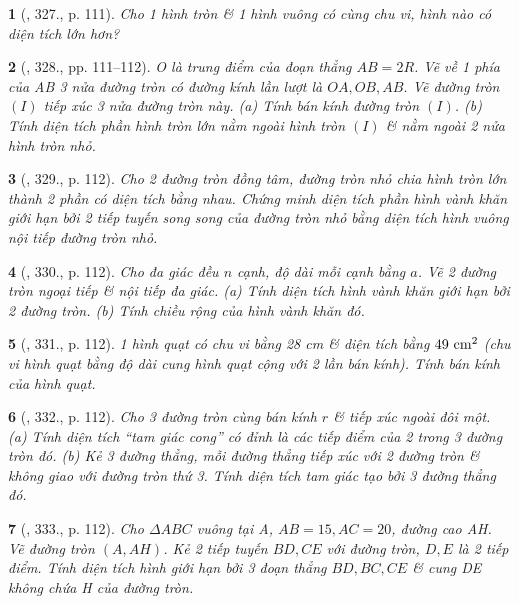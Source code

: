 \documentclass{article}
\newtheorem{baitoan}{}
\begin{document}
\begin{baitoan}[\cite{Binh_Toan_9_tap_2}, 327., p. 111]
	Cho 1 hình tròn \& 1 hình vuông có cùng chu vi, hình nào có diện tích lớn hơn?
\end{baitoan}

\begin{baitoan}[\cite{Binh_Toan_9_tap_2}, 328., pp. 111--112]
	O là trung điểm của đoạn thẳng $AB = 2R$. Vẽ về 1 phía của AB 3 nửa đường tròn có đường kính lần lượt là $OA,OB,AB$. Vẽ đường tròn $(I)$ tiếp xúc 3 nửa đường tròn này. (a) Tính bán kính đường tròn $(I)$. (b) Tính diện tích phần hình tròn lớn nằm ngoài hình tròn $(I)$ \& nằm ngoài 2 nửa hình tròn nhỏ.
\end{baitoan}

\begin{baitoan}[\cite{Binh_Toan_9_tap_2}, 329., p. 112]
	Cho 2 đường tròn đồng tâm, đường tròn nhỏ chia hình tròn lớn thành 2 phần có diện tích bằng nhau. Chứng minh diện tích phần hình vành khăn giới hạn bởi 2 tiếp tuyến song song của đường tròn nhỏ bằng diện tích hình vuông nội tiếp đường tròn nhỏ.
\end{baitoan}

\begin{baitoan}[\cite{Binh_Toan_9_tap_2}, 330., p. 112]
	Cho đa giác đều $n$ cạnh, độ dài mỗi cạnh bằng $a$. Vẽ 2 đường tròn ngoại tiếp \& nội tiếp đa giác. (a) Tính diện tích hình vành khăn giới hạn bởi 2 đường tròn. (b) Tính chiều rộng của hình vành khăn đó.
\end{baitoan}

\begin{baitoan}[\cite{Binh_Toan_9_tap_2}, 331., p. 112]
	1 hình quạt có chu vi bằng {\rm28 cm} \& diện tích bằng $\rm49\ cm^2$ (chu vi hình quạt bằng độ dài cung hình quạt cộng với 2 lần bán kính). Tính bán kính của hình quạt.
\end{baitoan}

\begin{baitoan}[\cite{Binh_Toan_9_tap_2}, 332., p. 112]
	Cho 3 đường tròn cùng bán kính $r$ \& tiếp xúc ngoài đôi một. (a) Tính diện tích ``tam giác cong'' có đỉnh là các tiếp điểm của 2 trong 3 đường tròn đó. (b) Kẻ 3 đường thẳng, mỗi đường thẳng tiếp xúc với 2 đường tròn \& không giao với đường tròn thứ 3. Tính diện tích tam giác tạo bởi 3 đường thẳng đó.
\end{baitoan}

\begin{baitoan}[\cite{Binh_Toan_9_tap_2}, 333., p. 112]
	Cho $\Delta ABC$ vuông tại A, $AB = 15,AC = 20$, đường cao AH. Vẽ đường tròn $(A,AH)$. Kẻ 2 tiếp tuyến $BD,CE$ với đường tròn, $D,E$ là 2 tiếp điểm. Tính diện tích hình giới hạn bởi 3 đoạn thẳng $BD,BC,CE$ \& cung DE không chứa H của đường tròn.
\end{baitoan}
\end{document}
